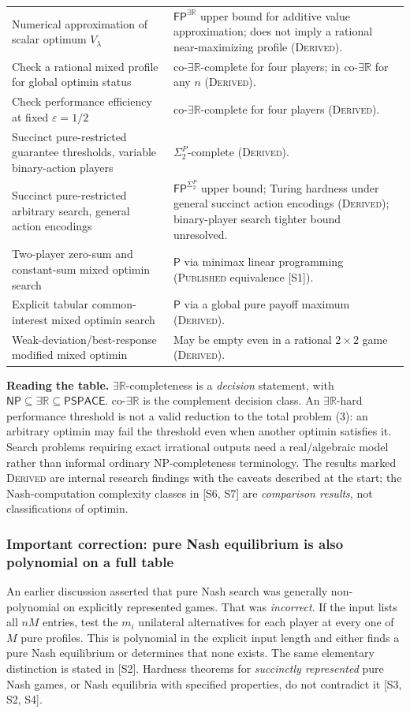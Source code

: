 \documentclass[11pt,a4paper]{article}
\providecommand{\ER}{\exists\mathbb R}
\providecommand{\coER}{\mathrm{co}\text{-}\exists\mathbb R}
\providecommand{\NP}{\mathsf{NP}}
\providecommand{\FP}{\mathsf{FP}}
\providecommand{\Ptime}{\mathsf{P}}
\providecommand{\PSPACE}{\mathsf{PSPACE}}
\begin{document}
\begin{longtable}{p{}p{}}
Numerical approximation of scalar optimum $V_\lambda$ & $\FP^{\ER}$ upper bound for additive value approximation; does not imply a rational near-maximizing profile (\textsc{Derived}).\\
Check a rational mixed profile for global optimin status & $\coER$-complete for four players; in $\coER$ for any $n$ (\textsc{Derived}).\\
Check performance efficiency at fixed $\varepsilon=1/2$ & $\coER$-complete for four players (\textsc{Derived}).\\
Succinct pure-restricted guarantee thresholds, variable binary-action players & $\Sigma_2^P$-complete (\textsc{Derived}).\\
Succinct pure-restricted arbitrary search, general action encodings & $\FP^{\Sigma_2^P}$ upper bound; Turing hardness under general succinct action encodings (\textsc{Derived}); binary-player search tighter bound unresolved.\\
Two-player zero-sum and constant-sum mixed optimin search & $\Ptime$ via minimax linear programming (\textsc{Published} equivalence [S1]).\\
Explicit tabular common-interest mixed optimin search & $\Ptime$ via a global pure payoff maximum (\textsc{Derived}).\\
Weak-deviation/best-response modified mixed optimin & May be empty even in a rational $2\times2$ game (\textsc{Derived}).\\
\bottomrule
\end{longtable}
\normalsize

\textbf{Reading the table.} $\ER$-completeness is a \emph{decision} statement, with $\NP\subseteq\ER\subseteq\PSPACE$. $\coER$ is the complement decision class. An $\ER$-hard performance threshold is not a valid reduction to the total problem (3): an arbitrary optimin may fail the threshold even when another optimin satisfies it. Search problems requiring exact irrational outputs need a real/algebraic model rather than informal ordinary NP-completeness terminology. The results marked \textsc{Derived} are internal research findings with the caveats described at the start; the Nash-computation complexity classes in [S6, S7] are \emph{comparison results}, not classifications of optimin.

\subsubsection*{Important correction: pure Nash equilibrium is also polynomial on a full table}
An earlier discussion asserted that pure Nash search was generally non-polynomial on explicitly represented games. That was \emph{incorrect}. If the input lists all $nM$ entries, test the $m_i$ unilateral alternatives for each player at every one of $M$ pure profiles. This is polynomial in the explicit input length and either finds a pure Nash equilibrium or determines that none exists. The same elementary distinction is stated in [S2]. Hardness theorems for \emph{succinctly represented} pure Nash games, or Nash equilibria with specified properties, do not contradict it [S3, S2, S4].
\end{document}

